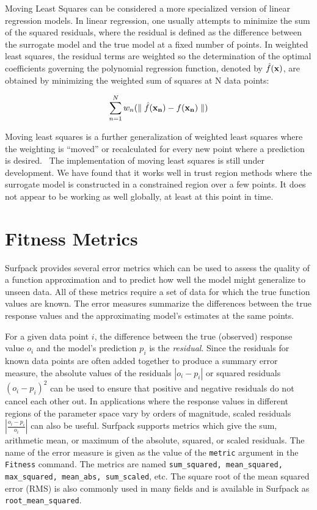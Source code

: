\documentclass{article}
\begin{document}
Moving Least Squares can be considered a more specialized 
version of linear regression models.  In linear regression, 
one usually attempts to minimize the sum of the squared residuals, 
where the residual is defined as the difference between the 
surrogate model and the true model at a fixed number of points. 
In weighted least squares, the residual terms are weighted so the 
determination of the optimal coefficients governing the polynomial 
regression function, denoted by $\hat{f}({\bf x})$, are obtained by 
minimizing the weighted sum of squares at N data points: 

\begin{equation}
  \sum_{n=1}^{N}w_{n}({\parallel \hat{f}({\bf x_{n}})-f({\bf x_{n}})\parallel})
  \label{models:surf:equation12}  
\end{equation}

Moving least squares is a further generalization of weighted least squares
where the weighting is ``moved'' or recalculated for every new point where 
a prediction is desired.~\cite{nealen}  The implementation of 
moving least squares 
is still under development.  We have found that it works well 
in trust region methods where the surrogate model is constructed in 
a constrained region over a few points.  It does not appear to be working 
as well globally, at least at this point in time.

\section{Fitness Metrics}
Surfpack provides several error metrics which can be used to assess the quality of a function approximation and to predict how well the model might generalize to unseen data.  All of these metrics require a set of data for which the true function values are known.  The error measures summarize the differences between the true response values and the approximating model's estimates at the same points.

For a given data point $i$, the difference between the true (observed) response value $o_i$ and the model's prediction $p_i$ is the {\em residual}.  Since the residuals for known data points are often added together to produce a summary error measure, the absolute values of the residuals $|o_i - p_i|$ or squared residuals $(o_i - p_i)^2$ can be used to ensure that positive and negative residuals do not cancel each other out.  In applications where the response values in different regions of the parameter space vary by orders of magnitude, scaled residuals $|\frac{o_i - p_i}{o_i}|$ can also be useful.  Surfpack supports metrics which give the sum, arithmetic mean, or maximum of the absolute, squared, or scaled residuals.  The name of the error measure is given as the value of the \texttt{metric} argument in the \texttt{Fitness} command.  The metrics are named \texttt{sum\_squared, mean\_squared, max\_squared, mean\_abs, sum\_scaled}, etc.  The square root of the mean squared error (RMS) is also commonly used in many fields and is available in Surfpack as \texttt{root\_mean\_squared}.  
\end{document}
